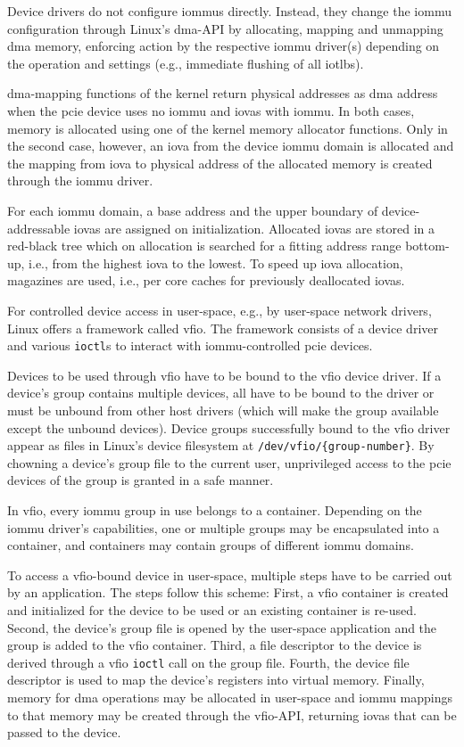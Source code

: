 Device drivers do not configure \acp{iommu} directly. Instead, they change the
\ac{iommu} configuration through Linux's \ac{dma}-API by allocating, mapping and
unmapping \ac{dma} memory, enforcing action by the respective \ac{iommu}
driver(s) depending on the operation and settings (e.g., immediate flushing of
all \acp{iotlb}).

\ac{dma}-mapping functions of the kernel return physical addresses as \ac{dma}
address when the \ac{pcie} device uses no \ac{iommu} and \acp{iova} with
\ac{iommu}. In both cases, memory is allocated using one of the kernel memory
allocator functions. Only in the second case, however, an \ac{iova} from the
device \ac{iommu} domain is allocated and the mapping from \ac{iova} to physical
address of the allocated memory is created through the \ac{iommu} driver.

For each \ac{iommu} domain, a base address and the upper boundary of
device-addressable \acp{iova} are assigned on initialization. Allocated
\acp{iova} are stored in a red-black tree which on allocation is searched for a
fitting address range bottom-up, i.e., from the highest \ac{iova} to the lowest.
To speed up \ac{iova} allocation, magazines are used, i.e., per core caches for
previously deallocated \acp{iova}.

For controlled device access in user-space, e.g., by user-space network drivers,
Linux offers a framework called \ac{vfio}. The framework consists of a device
driver and various \texttt{ioctl}s to interact with \ac{iommu}-controlled
\ac{pcie} devices.

Devices to be used through \ac{vfio} have to be bound to the \ac{vfio} device
driver. If a device's group contains multiple devices, all have to be bound to
the driver or must be unbound from other host drivers (which will make the group
available except the unbound devices). Device groups successfully bound to the
\ac{vfio} driver appear as files in Linux's device filesystem at
\texttt{/dev/vfio/\{group-number\}}. By chowning a device's group file to the
current user, unprivileged access to the \ac{pcie} devices of the group is
granted in a safe manner.

In \ac{vfio}, every \ac{iommu} group in use belongs to a container. Depending on
the \ac{iommu} driver's capabilities, one or multiple groups may be encapsulated
into a container, and containers may contain groups of different \ac{iommu}
domains.

To access a \ac{vfio}-bound device in user-space, multiple steps have to be
carried out by an application. The steps follow this scheme: First, a \ac{vfio}
container is created and initialized for the device to be used or an existing
container is re-used. Second, the device's group file is opened by the
user-space application and the group is added to the \ac{vfio} container. Third,
a file descriptor to the device is derived through a \ac{vfio} \texttt{ioctl}
call on the group file. Fourth, the device file descriptor is used to map the
device's registers into virtual memory. Finally, memory for \ac{dma} operations
may be allocated in user-space and \ac{iommu} mappings to that memory may be
created through the \ac{vfio}-API, returning \acp{iova} that can be passed to
the device.

